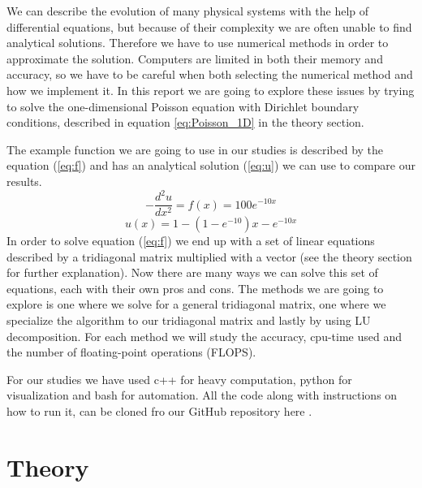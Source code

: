 \documentclass[reprint, english,notitlepage]{revtex4-1}  %
\begin{document}
We can describe the evolution of many physical systems with the help of differential equations, but because of their complexity we are often unable to find analytical solutions. Therefore we have to use numerical methods in order to approximate the solution. Computers are limited in both their memory and accuracy, so we have to be careful when both selecting the numerical method and how we implement it. In this report we are going to explore these issues by trying to solve the one-dimensional Poisson equation with Dirichlet boundary conditions, described in equation \ref{eq:Poisson_1D} in the theory section.

The example function we are going to use in our studies is described by the equation (\ref{eq:f}) and has an analytical solution (\ref{eq:u}) we can use to compare our results.
\begin{equation}
	-\frac{d^2u}{dx^2} = f(x) = 100e^{-10x}
	\label{eq:f}
\end{equation}
\begin{equation}
	u(x) = 1 - (1 - e^{-10})x - e^{-10x}
	\label{eq:u}
\end{equation}
In order to solve equation (\ref{eq:f}) we end up with a set of linear equations described by a tridiagonal matrix multiplied with a vector (see the theory section for further explanation). Now there are many ways we can solve this set of equations, each with their own pros and cons. The methods we are going to explore is one where we solve for a general tridiagonal matrix, one where we specialize the algorithm to our tridiagonal matrix and lastly by using LU decomposition. For each method we will study the accuracy, cpu-time used and the number of floating-point operations (FLOPS).

For our studies we have used c++ for heavy computation, python for visualization and bash for automation. All the code along with instructions on how to run it, can be cloned fro our GitHub repository here \citep{github}.



\section{Theory}
\end{document}
